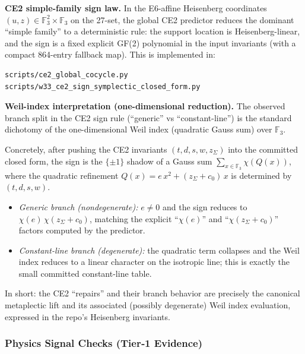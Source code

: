 \documentclass[11pt]{article}
\providecommand{\tightlist}{%
  \setlength{\itemsep}{0pt}\setlength{\parskip}{0pt}}
\begin{document}
\textbf{CE2 simple-family sign law.} In the E6-affine Heisenberg coordinates
$(u,z)\in\mathbb{F}_3^2\times\mathbb{F}_3$ on the 27-set, the global CE2
predictor reduces the dominant ``simple family'' to a deterministic rule: the
support location is Heisenberg-linear, and the sign is a fixed explicit GF(2)
polynomial in the input invariants (with a compact 864-entry fallback map).
This is implemented in:
\begin{verbatim}
scripts/ce2_global_cocycle.py
scripts/w33_ce2_sign_symplectic_closed_form.py
\end{verbatim}

\textbf{Weil-index interpretation (one-dimensional reduction).} The observed
branch split in the CE2 sign rule (``generic'' vs ``constant-line'') is the
standard dichotomy of the one-dimensional Weil index (quadratic Gauss sum)
over $\mathbb{F}_3$.

Concretely, after pushing the CE2 invariants $(t,d,s,w,z_\Sigma)$ into the
committed closed form, the sign is the $\{\pm1\}$ shadow of a Gauss sum
\(\sum_{x\in\mathbb{F}_3} \chi(Q(x))\), where the quadratic refinement
$Q(x)=e\,x^2+(z_\Sigma+c_0)\,x$ is determined by $(t,d,s,w)$.
\begin{itemize}
\tightlist
\item \emph{Generic branch (nondegenerate):} $e\neq 0$ and the sign reduces to
  $\chi(e)\,\chi(z_\Sigma+c_0)$, matching the explicit ``$\chi(e)$'' and
  ``$\chi(z_\Sigma+c_0)$'' factors computed by the predictor.
\item \emph{Constant-line branch (degenerate):} the quadratic term collapses
  and the Weil index reduces to a linear character on the isotropic line;
  this is exactly the small committed constant-line table.
\end{itemize}

In short: the CE2 ``repairs'' and their branch behavior are precisely the
canonical metaplectic lift and its associated (possibly degenerate) Weil index
evaluation, expressed in the repo's Heisenberg invariants.

\subsubsection{Physics Signal Checks (Tier‑1
Evidence)}\label{physics-signal-checks-tier1-evidence}
\end{document}
